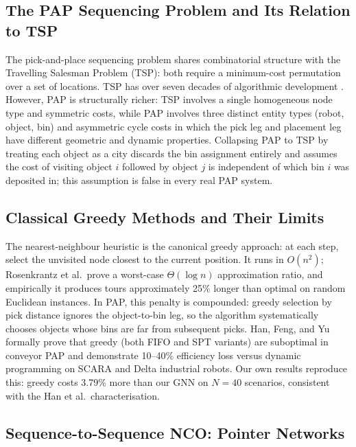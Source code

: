 \documentclass[conference]{IEEEtran}
\begin{document}
\subsection{The PAP Sequencing Problem and Its Relation to TSP}

The pick-and-place sequencing problem shares combinatorial structure with the Travelling Salesman Problem (TSP): both require a minimum-cost permutation over a set of locations. TSP has over seven decades of algorithmic development \cite{dantzig1954}. However, PAP is structurally richer: TSP involves a single homogeneous node type and symmetric costs, while PAP involves three distinct entity types (robot, object, bin) and asymmetric cycle costs in which the pick leg and placement leg have different geometric and dynamic properties. Collapsing PAP to TSP by treating each object as a city discards the bin assignment entirely and assumes the cost of visiting object $i$ followed by object $j$ is independent of which bin $i$ was deposited in; this assumption is false in every real PAP system.

\subsection{Classical Greedy Methods and Their Limits}

The nearest-neighbour heuristic \cite{rosenkrantz1977} is the canonical greedy approach: at each step, select the unvisited node closest to the current position. It runs in $O(n^2)$; Rosenkrantz et al.\ prove a worst-case $\Theta(\log n)$ approximation ratio, and empirically it produces tours approximately 25\% longer than optimal on random Euclidean instances. In PAP, this penalty is compounded: greedy selection by pick distance ignores the object-to-bin leg, so the algorithm systematically chooses objects whose bins are far from subsequent picks. Han, Feng, and Yu \cite{han2019pap} formally prove that greedy (both FIFO and SPT variants) are suboptimal in conveyor PAP and demonstrate 10--40\% efficiency loss versus dynamic programming on SCARA and Delta industrial robots. Our own results reproduce this: greedy costs 3.79\% more than our GNN on $N{=}40$ scenarios, consistent with the Han et al.\ characterisation.

\subsection{Sequence-to-Sequence NCO: Pointer Networks}
\end{document}
